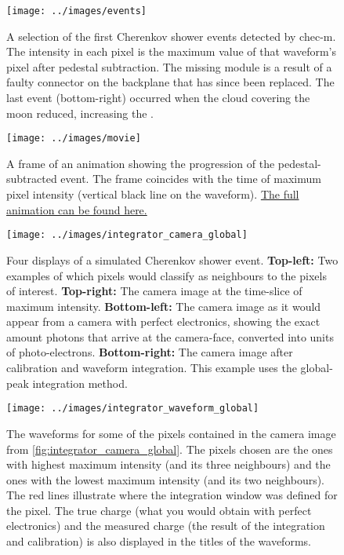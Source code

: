 \documentclass[%
amsmath,amssymb,
onecolumn,
a4paper,
10pt
]{article}%
\newcommand*\glsr[2][]{\glsdisp[#1]{#2}{\glsentryshort{#2} (\glsentrylong{#2})}}
\begin{document}
	\newpage
	
	\begin{figure}[H]
		\centering
		\texttt{[image: ../images/events]}
		\caption{\label{fig:events} A selection of the first Cherenkov shower events detected by \gls{chec-m}. The intensity in each pixel is the maximum value of that waveform's pixel after pedestal subtraction. The missing module is a result of a faulty connector on the backplane that has since been replaced. The last event (bottom-right) occurred when the cloud covering the moon reduced, increasing the \glsr{nsb}.}
	\end{figure}
	
	\begin{figure}[hb]
		\centering
		\texttt{[image: ../images/movie]}
		\caption{\label{fig:movie} A frame of an animation showing the progression of the pedestal-subtracted event. The frame coincides with the time of maximum pixel intensity (vertical black line on the waveform). \href{http://www.hap-astroparticle.org/img/news_15-12-08_CTA_GCTPrototype-cam_event_GIF.gif}{The full animation can be found here.}}
	\end{figure}
	
	\newpage
	
	\begin{figure}[H]
		\centering
		\texttt{[image: ../images/integrator\_camera\_global]}
		\caption{\label{fig:integrator_camera_global} Four displays of a simulated Cherenkov shower event. \textbf{Top-left:} Two examples of which pixels would classify as neighbours to the pixels of interest. \textbf{Top-right:} The camera image at the time-slice of maximum intensity. \textbf{Bottom-left:} The camera image as it would appear from a camera with perfect electronics, showing the exact amount photons that arrive at the camera-face, converted into units of photo-electrons. \textbf{Bottom-right:} The camera image after calibration and waveform integration. This example uses the global-peak integration method.}
	\end{figure}
	
	\begin{figure}[H]
		\centering
		\texttt{[image: ../images/integrator\_waveform\_global]}
		\caption{\label{fig:integrator_waveform_global} The waveforms for some of the pixels contained in the camera image from \autoref{fig:integrator_camera_global}. The pixels chosen are the ones with highest maximum intensity (and its three neighbours) and the ones with the lowest maximum intensity (and its two neighbours). The red lines illustrate where the integration window was defined for the pixel. The true charge (what you would obtain with perfect electronics) and the measured charge (the result of the integration and calibration) is also displayed in the titles of the waveforms.}
	\end{figure}
	
\end{document}
